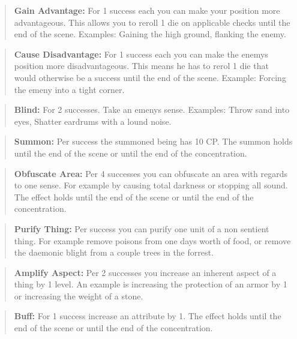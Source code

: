 \documentclass[11pt]{article}
\begin{document}
{\begin{multicols}{2}[]
\begin{quote}
\textbf{Gain Advantage:} For 1 success each you can make your position more advantageous. This allows you to reroll 1 die on applicable checks until the end of the scene. Examples: Gaining the high ground, flanking the enemy.
\end{quote}

\begin{quote}
\textbf{Cause Disadvantage:} For 1 success each you can make the enemys position more disadvantageous. This means he has to rerol 1 die that would otherwise be a success until the end of the scene. Example: Forcing the emeny into a tight corner. 
\end{quote}

\begin{quote}
\textbf{Blind:} For 2 successes. Take an emenys sense. Examples: Throw sand into eyes, Shatter eardrums with a lound noise.
\end{quote}

\begin{quote}
\textbf{Summon:} Per success the summoned being has 10 CP. The summon holds until the end of the scene or until the end of the concentration.
\end{quote}

\begin{quote}
\textbf{Obfuscate Area:} Per 4 successes you can obfuscate an area with regards to one sense. For example by causing total darkness or stopping all sound. The effect holds until the end of the scene or until the end of the concentration.
\end{quote}

\begin{quote}
\textbf{Purify Thing:} Per success you can purify one unit of a non sentient thing. For example remove poisons from one days worth of food, or remove the daemonic blight from a couple trees in the forrest.
\end{quote}

\begin{quote}
\textbf{Amplify Aspect:} Per 2 successes you increase an inherent aspect of a thing by 1 level. An example is increasing the protection of an armor by 1 or increasing the weight of a stone.
\end{quote}

\begin{quote}
\textbf{Buff:} For 1 success increase an attribute by 1. The effect holds until the end of the scene or until the end of the concentration.
\end{quote}


\end{multicols}}
\end{document}
